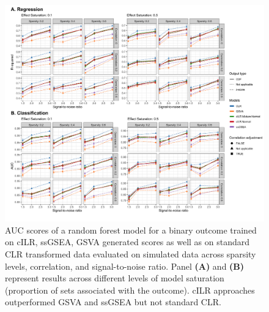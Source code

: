 \documentclass{article}
\begin{document}
\begin{figure}[H]
    \centering
    \includegraphics[width = \linewidth]{figures/sim_pred_combined.png}
    \caption{AUC scores of a random forest model for a binary outcome trained on cILR, ssGSEA, GSVA generated scores as well as on standard CLR transformed data evaluated on simulated data across sparsity levels, correlation, and signal-to-noise ratio. Panel \textbf{(A)} and \textbf{(B)} represent results across different levels of model saturation (proportion of sets associated with the outcome). cILR approaches outperformed GSVA and ssGSEA but not standard CLR.}
    \label{fig:6}
\end{figure}


\end{document}
